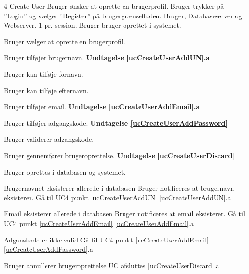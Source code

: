 
\uchead
	{4}
	{Create User}
	{Bruger ønsker at oprette en brugerprofil.}
	{Bruger trykker på ''Login'' og vælger ''Register'' på brugergrænsefladen.}
	{Bruger, Databaseserver og Webserver.}
	{}
	{1 pr. session.}
	{Bruger bruger oprettet i systemet.}

\item \label{ucCreateUserOptions} Bruger vælger at oprette en brugerprofil. \newline

\item \label{ucCreateUserAddUN} Bruger tilføjer brugernavn.
\textbf{Undtagelse \ref{ucCreateUserAddUN}.a}

\item Bruger kan tilføje fornavn.
\item Bruger kan tilføje efternavn.

\item \label{ucCreateUserAddEmail} Bruger tilføjer email.
\textbf{Undtagelse \ref{ucCreateUserAddEmail}.a}

\item \label{ucCreateUserAddPassword} Bruger tilføjer adgangskode.
\textbf{Undtagelse \ref{ucCreateUserAddPassword}}

\item Bruger validerer adgangskode.

\item \label{ucCreateUserDiscard} Bruger gennemfører brugeroprettelse.
\textbf{Undtagelse \ref{ucCreateUserDiscard}}

\item \label{ucCreateUserCreated} Bruger oprettes i databasen og systemet.

\ucdescriptionend


	
	
\ucextension
	{Brugernavnet eksisterer allerede i databasen}
	{Bruger notificeres at brugernavn eksisterer.\newline
	Gå til UC4 punkt \ref{ucCreateUserAddUN}}
	{\ref{ucCreateUserAddUN}.a}
	


\ucextension
	{Email eksisterer allerede i databasen}
	{Bruger notificeres at email eksisterer.\newline
	Gå til UC4 punkt \ref{ucCreateUserAddEmail}}
	{\ref{ucCreateUserAddEmail}.a}



\ucextension
	{Adganskode er ikke valid}
	{Gå til UC4 punkt \ref{ucCreateUserAddEmail}}
	{\ref{ucCreateUserAddPassword}.a}



\ucextension
	{Bruger annullerer brugeroprettelse}
	{UC afsluttes}
	{\ref{ucCreateUserDiscard}.a}
		
